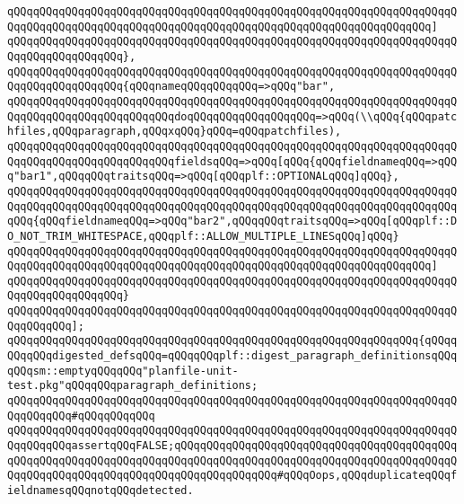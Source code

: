 \verb|qQQqqQQqqQQqqQQqqQQqqQQqqQQqqQQqqQQqqQQqqQQqqQQqqQQqqQQqqQQqqQQqqQQqqQQqqQQqqQQqqQQqqQQqqQQqqQQqqQQqqQQqqQQqqQQqqQQqqQQqqQQqqQQqqQQqqQQq]|\newline
\verb|qQQqqQQqqQQqqQQqqQQqqQQqqQQqqQQqqQQqqQQqqQQqqQQqqQQqqQQqqQQqqQQqqQQqqQQqqQQqqQQqqQQqqQQq},|\newline
\newline
\verb|qQQqqQQqqQQqqQQqqQQqqQQqqQQqqQQqqQQqqQQqqQQqqQQqqQQqqQQqqQQqqQQqqQQqqQQqqQQqqQQqqQQqqQQq{qQQqnameqQQqqQQqqQQq=>qQQq"bar",|\newline
\verb|qQQqqQQqqQQqqQQqqQQqqQQqqQQqqQQqqQQqqQQqqQQqqQQqqQQqqQQqqQQqqQQqqQQqqQQqqQQqqQQqqQQqqQQqqQQqqQQqdoqQQqqQQqqQQqqQQqqQQq=>qQQq(\\qQQq{qQQqpatchfiles,qQQqparagraph,qQQqxqQQq}qQQq=qQQqpatchfiles),|\newline
\verb|qQQqqQQqqQQqqQQqqQQqqQQqqQQqqQQqqQQqqQQqqQQqqQQqqQQqqQQqqQQqqQQqqQQqqQQqqQQqqQQqqQQqqQQqqQQqqQQqfieldsqQQq=>qQQq[qQQq{qQQqfieldnameqQQq=>qQQq"bar1",qQQqqQQqtraitsqQQq=>qQQq[qQQqplf::OPTIONALqQQq]qQQq},|\newline
\verb|qQQqqQQqqQQqqQQqqQQqqQQqqQQqqQQqqQQqqQQqqQQqqQQqqQQqqQQqqQQqqQQqqQQqqQQqqQQqqQQqqQQqqQQqqQQqqQQqqQQqqQQqqQQqqQQqqQQqqQQqqQQqqQQqqQQqqQQqqQQqqQQq{qQQqfieldnameqQQq=>qQQq"bar2",qQQqqQQqtraitsqQQq=>qQQq[qQQqplf::DO_NOT_TRIM_WHITESPACE,qQQqplf::ALLOW_MULTIPLE_LINESqQQq]qQQq}|\newline
\verb|qQQqqQQqqQQqqQQqqQQqqQQqqQQqqQQqqQQqqQQqqQQqqQQqqQQqqQQqqQQqqQQqqQQqqQQqqQQqqQQqqQQqqQQqqQQqqQQqqQQqqQQqqQQqqQQqqQQqqQQqqQQqqQQqqQQqqQQq]|\newline
\verb|qQQqqQQqqQQqqQQqqQQqqQQqqQQqqQQqqQQqqQQqqQQqqQQqqQQqqQQqqQQqqQQqqQQqqQQqqQQqqQQqqQQqqQQq}|\newline
\verb|qQQqqQQqqQQqqQQqqQQqqQQqqQQqqQQqqQQqqQQqqQQqqQQqqQQqqQQqqQQqqQQqqQQqqQQqqQQqqQQq];|\newline
\newline
\verb|qQQqqQQqqQQqqQQqqQQqqQQqqQQqqQQqqQQqqQQqqQQqqQQqqQQqqQQqqQQqqQQq{qQQqqQQqqQQqdigested_defsqQQq=qQQqqQQqplf::digest_paragraph_definitionsqQQqqQQqsm::emptyqQQqqQQq"planfile-unit-test.pkg"qQQqqQQqparagraph_definitions;|\newline
\verb|qQQqqQQqqQQqqQQqqQQqqQQqqQQqqQQqqQQqqQQqqQQqqQQqqQQqqQQqqQQqqQQqqQQqqQQqqQQqqQQq#qQQqqQQqqQQq|\newline
\verb|qQQqqQQqqQQqqQQqqQQqqQQqqQQqqQQqqQQqqQQqqQQqqQQqqQQqqQQqqQQqqQQqqQQqqQQqqQQqqQQqassertqQQqFALSE;qQQqqQQqqQQqqQQqqQQqqQQqqQQqqQQqqQQqqQQqqQQqqQQqqQQqqQQqqQQqqQQqqQQqqQQqqQQqqQQqqQQqqQQqqQQqqQQqqQQqqQQqqQQqqQQqqQQqqQQqqQQqqQQqqQQqqQQqqQQqqQQqqQQqqQQqqQQq#qQQqOops,qQQqduplicateqQQqfieldnamesqQQqnotqQQqdetected.|\newline
